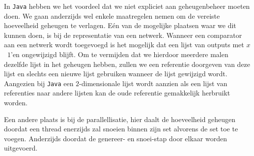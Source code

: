 \documentclass{article}
\begin{document}
In \texttt{Java} hebben we het voordeel dat we niet expliciet aan geheugenbeheer moeten doen.
We gaan anderzijds wel enkele maatregelen nemen om de vereiste hoeveelheid geheugen te verlagen.
E\'en van de mogelijke plaatsen waar we dit kunnen doen, is bij de representatie van een netwerk.
Wanneer een comparator aan een netwerk wordt toegevoegd is het mogelijk dat een lijst van outputs met $x$~$1$'en ongewijzigd blijft.
Om te vermijden dat we hierdoor meerdere malen dezelfde lijst in het geheugen hebben, zullen we een referentie doorgeven van deze lijst en slechts een nieuwe lijst gebruiken wanneer de lijst gewijzigd wordt.
Aangezien bij \texttt{Java} een $2$-dimensionale lijst wordt aanzien als een lijst van referenties naar andere lijsten kan de oude referentie gemakkelijk herbruikt worden. 

Een andere plaats is bij de parallellisatie, hier daalt de hoeveelheid geheugen doordat een thread enerzijds zal snoeien binnen zijn set alvorens de set toe te voegen.
Anderzijds doordat de genereer- en snoei-stap door elkaar worden uitgevoerd.
\end{document}
